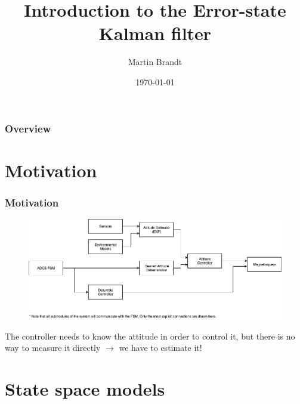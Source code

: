 \documentclass{beamer}
\title[ESKF Introduction]{Introduction to the Error-state Kalman filter} %
\author{Martin Brandt} %
\date{\today} %
\begin{document}
\begin{frame}
\titlepage %
\end{frame}

\begin{frame}
\frametitle{Overview} %
\tableofcontents %
\end{frame}

\section{Motivation}

\begin{frame}
    \frametitle{Motivation}
    \begin{figure}
    \includegraphics[width=0.8\linewidth]{adcs.png}
    \end{figure}
    The controller needs to know the attitude in order to control it, but there is no way to measure it directly $\rightarrow$ we have to estimate it!
\end{frame}


\section{State space models}
\end{document}
